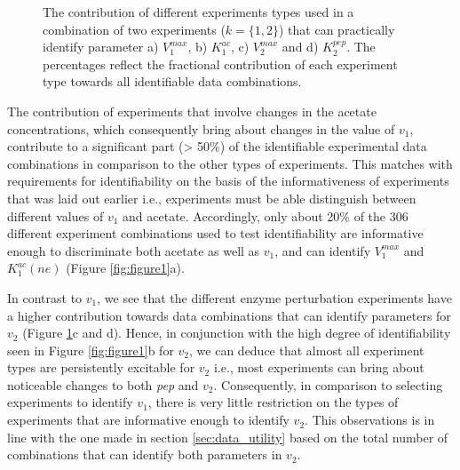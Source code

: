 \documentclass[10pt]{article}
\begin{document}
\begin{figure}[!tbhp]
	\caption{The contribution of different experiments types used in a combination of two experiments ($k = \{1, 2\}$) that can practically identify parameter a) $V_1^{max}$, b) $K_1^{ac}$, c) $V_2^{max}$ and d) $K_2^{pep}$. The percentages reflect the fractional contribution of each experiment type towards all identifiable data combinations.}\label{fig:figure2}
\end{figure} 

The contribution of experiments that involve changes in the acetate concentrations, which consequently bring about changes in the value of $v_1$, contribute to a significant part (> 50\%) of the identifiable experimental data combinations in comparison to the other types of experiments. This matches with requirements for identifiability on the basis of the informativeness of experiments that was laid out earlier i.e., experiments must be able distinguish between different values of $v_1$ and acetate. Accordingly, only about 20\% of the 306 different experiment combinations used to test identifiability are informative enough to discriminate both acetate as well as $v_1$, and can identify $V_1^{max}$ and $K_1^{ac}(ne)$ (Figure \ref{fig:figure1}a). 	

In contrast to $v_1$, we see that the different enzyme perturbation experiments have a higher contribution towards data combinations that can identify parameters for $v_2$ (Figure \ref{fig:figure2}c and d). Hence, in conjunction with the high degree of identifiability seen in Figure \ref{fig:figure1}b for $v_2$, we can deduce that almost all experiment types are persistently excitable for $v_2$ i.e., most experiments can bring about noticeable changes to both \textit{pep} and $v_2$. Consequently, in comparison to selecting experiments to identify $v_1$, there is very little restriction on the types of experiments that are informative enough to identify $v_2$. This observations is in line with the one made in section \ref{sec:data_utility} based on the total number of combinations that can identify both parameters in $v_2$.
\end{document}
